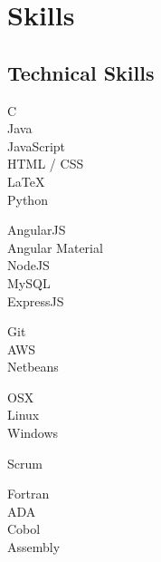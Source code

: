 \documentclass[letterpaper]{deedy-resume} %
\begin{document}
\begin{minipage}[t]{0.25\textwidth} %


\section{Skills}

\subsection{Technical Skills}

\textbullet{} C\\ 
\textbullet{} Java\\  
\textbullet{} JavaScript \\
\textbullet{} HTML / CSS\\
\textbullet{} LaTeX\ \\ 
\textbullet{} Python\\ 
\sectionspace %

\textbullet{}  AngularJS\\
\textbullet{}  Angular Material\\
\textbullet{} NodeJS\\
\textbullet{} MySQL\\
\textbullet{} ExpressJS \\ 
\sectionspace %

\textbullet{} Git\\
\textbullet{} AWS\\ 
\textbullet{} Netbeans\\
\sectionspace %

\textbullet{} OSX\\ 
\textbullet{} Linux \\
\textbullet{} Windows\\
\sectionspace %

\textbullet{} Scrum\\
\sectionspace %

\textbullet{} Fortran\\ 
\textbullet{} ADA\\ 
\textbullet{} Cobol \\ 
\textbullet{} Assembly\\


\end{minipage}
\end{document}
